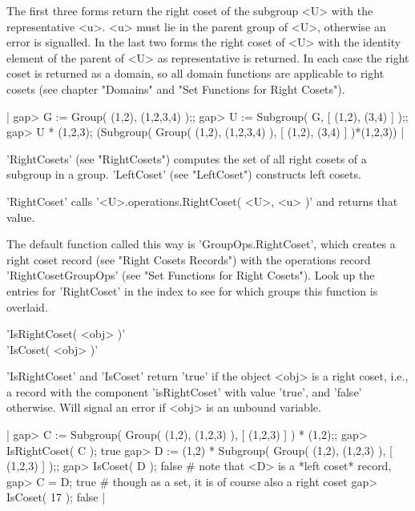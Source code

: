 The first three forms return the right coset of the subgroup <U> with the
representative <u>.  <u> must  lie in the parent  group of <U>, otherwise
an error is signalled.  In the last two forms the right coset of <U> with
the identity element of the parent of <U>  as representative is returned.
In  each case the   right coset is returned as   a domain, so all  domain
functions   are applicable to   right  cosets (see chapter  "Domains" and
"Set Functions for Right Cosets").

|    gap> G := Group( (1,2), (1,2,3,4) );;
    gap> U := Subgroup( G, [ (1,2), (3,4) ] );;
    gap> U * (1,2,3);
    (Subgroup( Group( (1,2), (1,2,3,4) ), [ (1,2), (3,4) ] )*(1,2,3)) |

'RightCosets' (see "RightCosets") computes the set of all right cosets of
a subgroup  in  a group.  'LeftCoset'   (see "LeftCoset") constructs left
cosets.

'RightCoset' calls '<U>.operations.RightCoset(  <U>, <u>  )' and  returns
that value.

The default  function called this  way  is  'GroupOps.RightCoset',  which
creates a  right  coset record  (see  "Right  Cosets  Records") with  the
operations  record  'RightCosetGroupOps' (see "Set  Functions  for  Right
Cosets").  Look  up the entries for 'RightCoset' in the index  to see for
which groups this function is overlaid.

%
%

'IsRightCoset( <obj> )' \\
'IsCoset( <obj> )'

'IsRightCoset' and 'IsCoset' return 'true' if the object <obj> is a right
coset,  i.e., a  record  with the   component 'isRightCoset' with   value
'true', and 'false' otherwise.   Will  signal  an error if  <obj>   is an
unbound variable.

|    gap> C := Subgroup( Group( (1,2), (1,2,3) ), [ (1,2,3) ] ) * (1,2);;
    gap> IsRightCoset( C );
    true
    gap> D := (1,2) * Subgroup( Group( (1,2), (1,2,3) ), [ (1,2,3) ] );;
    gap> IsCoset( D );
    false    # note that <D> is a *left coset* record,
    gap> C = D;
    true     # though as a set, it is of course also a right coset
    gap> IsCoset( 17 );
    false |

%

